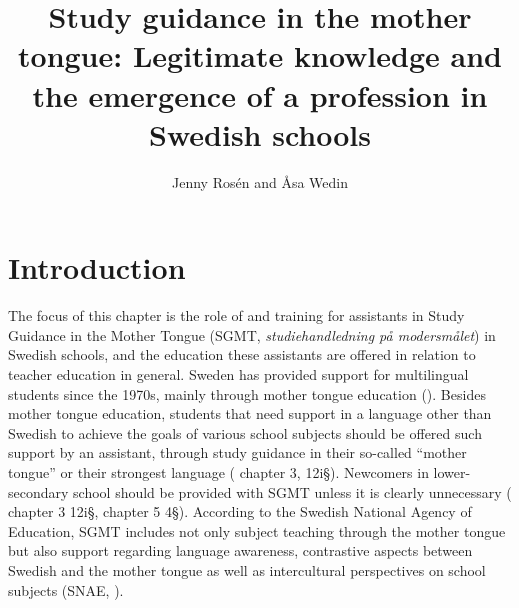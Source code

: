 \documentclass[output=paper]{langscibook}
\author{Jenny Rosén\orcid{Stockholm University}\affiliation{} and Åsa Wedin\orcid{}\affiliation{Dalarna University}}
\title[Study guidance in the mother tongue]{Study guidance in the mother tongue: Legitimate knowledge and the emergence of a profession in Swedish schools}
\begin{document}
\maketitle 
\label{chap:3}



\section{Introduction}

The focus of this chapter is the role of and training for assistants in Study Guidance in the Mother Tongue (SGMT, \textit{studiehandledning på modersmålet}) in Swedish schools, and the education these assistants are offered in relation to teacher education in general.  Sweden has provided support for multilingual students since the 1970s, mainly through mother tongue education (\citealt{GanuzaHyltenstam2020}). Besides mother tongue education, students that need support in a language other than Swedish to achieve the goals of various school subjects should be offered such support by an assistant, through study guidance in their so-called “mother tongue” or  their strongest language (\citealt{Swedish_ministry_of_education2010} chapter 3, 12i§). Newcomers  in lower-secondary school should be provided with SGMT unless it is clearly unnecessary (\citealt{Swedish_ministry_of_education2010} chapter 3 12i§, \citealt{Swedish_ministry_of_education2011} chapter 5 4§). According to the Swedish National Agency of Education, SGMT includes not only subject teaching through the mother tongue but also support regarding language awareness, contrastive aspects between Swedish and the mother tongue as well as intercultural perspectives on school subjects (SNAE, \citealt{Swedish_national_agency_of_education2015}).
\end{document}
